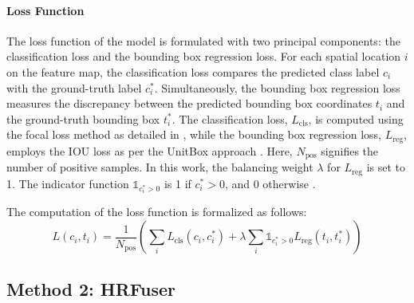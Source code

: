 \documentclass[report.tex]{subfiles}
\begin{document}

    \paragraph*{Loss Function}

    The loss function of the model is formulated with two principal components: the classification loss and the bounding box regression loss. For each spatial location \( i \) on the feature map, the classification loss compares the predicted class label \( c_i \) with the ground-truth label \( c_i^* \). Simultaneously, the bounding box regression loss measures the discrepancy between the predicted bounding box coordinates \( t_i \) and the ground-truth bounding box \( t_i^* \). The classification loss, \( L_{\text{cls}} \), is computed using the focal loss method as detailed in \cite{lin2017focal}, while the bounding box regression loss, \( L_{\text{reg}} \), employs the IOU loss as per the UnitBox approach \cite{yu2016unitbox}. Here, \( N_{\text{pos}} \) signifies the number of positive samples. In this work, the balancing weight \( \lambda \) for \( L_{\text{reg}} \) is set to 1. The indicator function \( \mathds{1}_{c_i^*>0} \) is 1 if \( c_i^* > 0 \), and 0 otherwise \cite{chang2020spatial}.

    The computation of the loss function is formalized as follows:
    \begin{equation}
        L(c_i, t_i) = \frac{1}{N_{\text{pos}}} \left( \sum_{i} L_{\text{cls}}(c_i, c_i^*) + \lambda \sum_{i} \mathds{1}_{c_i^*>0} L_{\text{reg}}(t_i, t_i^*) \right)
    \end{equation}


    \subsection{Method 2: HRFuser}
    \label{sec:hrfuser}
        
\end{document}
